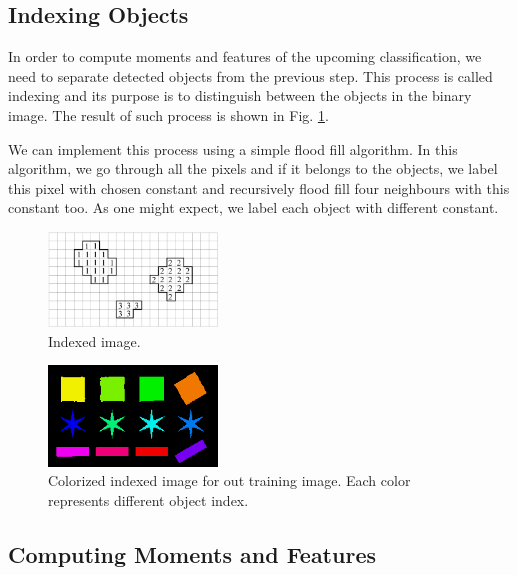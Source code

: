 \documentclass[12pt]{article}
\begin{document}
\subsection{Indexing Objects}

In order to compute moments and features of the upcoming classification, we need to separate detected objects from the previous step.
This process is called indexing and its purpose is to distinguish between the objects in the binary image. The result of such process
is shown in Fig. \ref{fig:indexing}.

We can implement this process using a simple flood fill algorithm. In this algorithm, we go through all the pixels and if it belongs to
the objects, we label this pixel with chosen constant and recursively flood fill four neighbours with this constant too. As one might expect,
we label each object with different constant.

\begin{figure}[hb]
\begin{centering}
\includegraphics[width=0.4\textwidth]{indexing_scheme.png}
\caption{Indexed image.}
\end{centering}
\label{fig:indexing}
\end{figure}

\begin{figure}[hb]
\begin{centering}
\includegraphics[width=0.4\textwidth]{indices_color.png}
\caption{Colorized indexed image for out training image. Each color represents different object index.}
\end{centering}
\label{fig:indices_color}
\end{figure}

\subsection{Computing Moments and Features}
\end{document}
